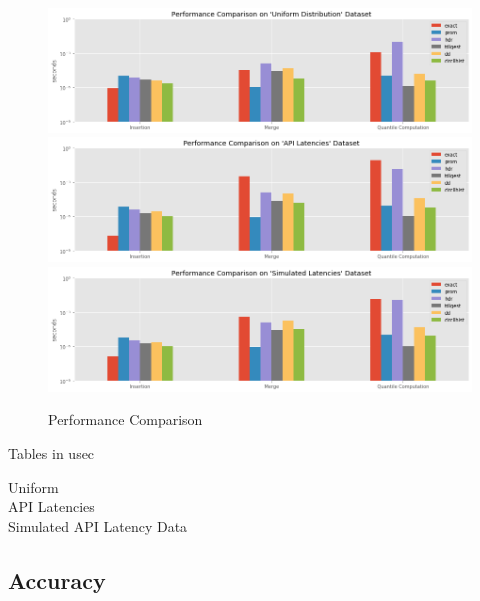 \documentclass{article}
\theoremstyle{plain}
\theoremstyle{remark}
\begin{document}
\begin{figure}
  \includegraphics[width=\textwidth]{evaluation/images/Uniform_Distribution_perf.png}
  \includegraphics[width=\textwidth]{evaluation/images/API_Latencies_perf.png}
  \includegraphics[width=\textwidth]{evaluation/images/Simulated_Latencies_perf.png}
  \caption{Performance Comparison}
\end{figure}

Tables in usec

Uniform\\


API Latencies\\


Simulated API Latency Data\\


\clearpage
\subsection{Accuracy}
\end{document}
